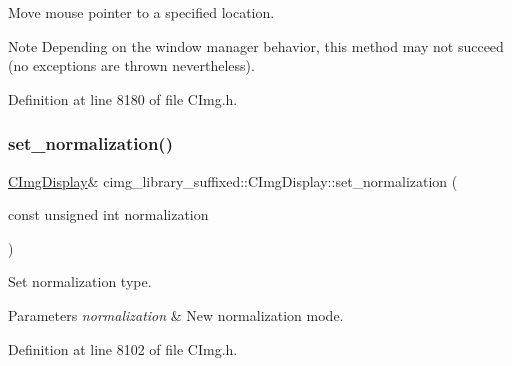 Move mouse pointer to a specified location. 

\begin{DoxyNote}{Note}
Depending on the window manager behavior, this method may not succeed (no exceptions are thrown nevertheless). 
\end{DoxyNote}


Definition at line 8180 of file C\+Img.\+h.

\mbox{\label{structcimg__library__suffixed_1_1CImgDisplay_a42bb3207015fb21b5898c299824cbbfc}} 
\subsubsection{\texorpdfstring{set\+\_\+normalization()}{set\_normalization()}}
{\footnotesize\ttfamily \hyperlink{structcimg__library__suffixed_1_1CImgDisplay}{C\+Img\+Display}\& cimg\+\_\+library\+\_\+suffixed\+::\+C\+Img\+Display\+::set\+\_\+normalization (\begin{DoxyParamCaption}\item[{const unsigned int}]{normalization }\end{DoxyParamCaption})\hspace{0.3cm}{\ttfamily [inline]}}



Set normalization type. 


\begin{DoxyParams}{Parameters}
{\em normalization} & New normalization mode. \\
\hline
\end{DoxyParams}


Definition at line 8102 of file C\+Img.\+h.

\mbox{\label{structcimg__library__suffixed_1_1CImgDisplay_ada6a7944d74a9e97e57dc22c936c68ab}} 
